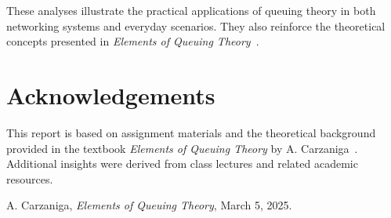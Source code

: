 \documentclass[12pt]{article}
\begin{document}
These analyses illustrate the practical applications of queuing theory in both networking systems and everyday scenarios. They also reinforce the theoretical concepts presented in \textit{Elements of Queuing Theory}~\cite{Carzaniga2025}.

\section*{Acknowledgements}
This report is based on assignment materials and the theoretical background provided in the textbook \textit{Elements of Queuing Theory} by A. Carzaniga~\cite{Carzaniga2025}. Additional insights were derived from class lectures and related academic resources.

\begin{thebibliography}{9}
  A. Carzaniga, \textit{Elements of Queuing Theory}, March 5, 2025.
\end{thebibliography}
\end{document}
